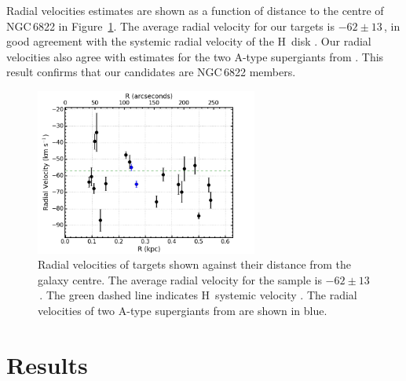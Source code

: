 Radial velocities estimates are shown as a function of distance to the centre of NGC\,6822 in Figure~\ref{fig:RvsRV}.
The average radial velocity for our targets is $-62\pm13$\,\kms,
in good agreement with the systemic radial velocity of the H\,\1 disk
\citep[$-57\pm2$\,\kms;][]{2004AJ....128...16K}.
Our radial velocities also agree with estimates for the two A-type supergiants from
\cite{2001ApJ...547..765V}.
This result confirms that our candidates are NGC\,6822 members.

\begin{figure}
 \centering
\includegraphics[width=0.65\textwidth]{ngc6822/N6822_RvsRV-v2}
\caption[Radial velocities shown against distance from galaxy centre]{
Radial velocities of targets shown against their distance from the galaxy centre.
The average radial velocity for the sample is $-62\pm13$\,\kms.
The green dashed line indicates H\,\1 systemic velocity
\protect\citep[$-57\pm2$\,\kms;][]{2004AJ....128...16K}.
The radial velocities of two A-type supergiants from
\protect\cite{2001ApJ...547..765V} are shown in blue.
        }
\label{fig:RvsRV}
\end{figure}



\section{Results} %
\label{sec:ngc6822results}

